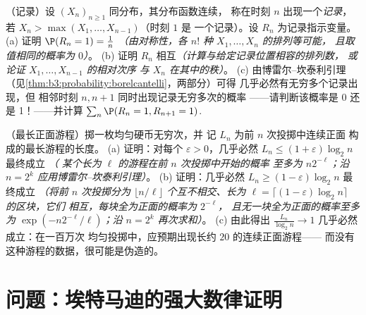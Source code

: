 \begin{exercise}[$\star\star$]\label{exo:b3:probability:11}
（记录）设 $(X_n)_{n\geq1}$ 同分布，其分布函数连续，
称在时刻 $n$ 出现一个\emph{记录}，若
$X_n > \max(X_1, \dots, X_{n-1})$（时刻 $1$ 是
一个记录）。设 $R_n$ 为记录指示变量。
(a) 证明 $\P(R_n = 1) = \frac1n$ \emph{（由对称性，各
$n!$ 种 $X_1, \dots, X_n$ 的排列等可能，
且取值相同的概率为 $0$）}。
(b) 证明 $R_n$ 相互\emph{}\emph{（计算与给定记录位置相容的排列数，
或论证
$X_1, \dots, X_{n-1}$ 的相对次序
与 $X_n$ 在其中的秩）}。
(c) 由博雷尔–坎泰利引理
（见\cref{thm:b3:probability:borelcantelli}，两部分）可得
几乎必然有无穷多个记录出现，但
相邻时刻 $n, n+1$ 同时出现记录无穷多次的概率
——请判断该概率是 0 还是 1！——并计算
$\sum_n\P(R_n = 1, R_{n+1} = 1)$.
\end{exercise}

\begin{exercise}[$\star\star$]\label{exo:b3:probability:12}
（最长正面游程）掷一枚均匀硬币无穷次，并
记 $L_n$ 为前 $n$ 次投掷中连续正面
构成的最长游程的长度。
(a) 证明：对每个 $\varepsilon > 0$，几乎必然 $L_n \leq
(1 + \varepsilon)\log_2n$ 最终成立 \emph{（
某个长为 $\ell$ 的游程在前 $n$ 次投掷中开始的概率
至多为 $n2^{-\ell}$；沿 $n =
2^k$ 应用博雷尔–坎泰利引理）}。
(b) 证明：几乎必然 $L_n \geq (1 - \varepsilon)\log_2n$
最终成立 \emph{（将前 $n$ 次投掷分为
$\lfloor n/\ell\rfloor$ 个互不相交、长为 $\ell =
\lceil(1 - \varepsilon)\log_2n\rceil$ 的区块，它们
相互，每块全为正面的概率为 $2^{-\ell}$，
且无一块全为正面的概率至多为
$\exp(-n2^{-\ell}/\ell)$；沿 $n = 2^k$ 再次求和）}。
(c) 由此得出 $\frac{L_n}{\log_2n} \to 1$ 几乎必然成立：在一百万次
均匀投掷中，应预期出现长约 $20$ 的连续正面游程——
而没有这种游程的数据，很可能是伪造的。
\end{exercise}

\section{问题：埃特马迪的强大数律证明}

